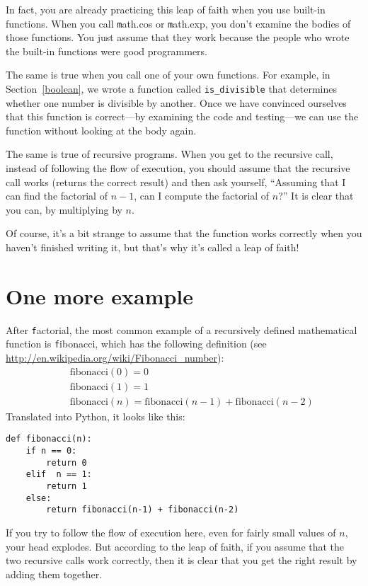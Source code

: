 \documentclass[
DIV=11,
fontsize=12,
twoside,
headinclude=false,
titlepage=firstiscover,
abstract=true,
headsepline=true,
footsepline=true,
chapterprefix=true, %
headings=big,
bibliography=totoc,%
captions=tableheading
]{scrbook}
\theoremstyle{definition}
\begin{document}
In fact, you are already practicing this leap of faith when you use
built-in functions.  When you call {\texttt math.cos} or {\texttt math.exp},
you don't examine the bodies of those functions.  You just
assume that they work because the people who wrote the built-in
functions were good programmers.

The same is true when you call one of your own functions.  For
example, in Section~\ref{boolean}, we wrote a function called 
\verb"is_divisible" that determines whether one number is divisible by
another.  Once we have convinced ourselves that this function is
correct---by examining the code and testing---we can use the function
without looking at the body again.

The same is true of recursive programs.  When you get to the recursive
call, instead of following the flow of execution, you should assume
that the recursive call works (returns the correct result) and then ask
yourself, ``Assuming that I can find the factorial of $n-1$, can I
compute the factorial of $n$?''  It is clear that you
can, by multiplying by $n$.

Of course, it's a bit strange to assume that the function works
correctly when you haven't finished writing it, but that's why
it's called a leap of faith!


\section{One more example}
\label{one.more.example}

After {\texttt factorial}, the most common example of a recursively
defined mathematical function is {\texttt fibonacci}, which has the
following definition (see
  \url{http://en.wikipedia.org/wiki/Fibonacci_number}):
%
\begin{eqnarray*}
&& \mathrm{fibonacci}(0) = 0 \\
&& \mathrm{fibonacci}(1) = 1 \\
&& \mathrm{fibonacci}(n) = \mathrm{fibonacci}(n-1) + \mathrm{fibonacci}(n-2)
\end{eqnarray*}
%
Translated into Python, it looks like this:

\begin{lstlisting}
def fibonacci(n):
    if n == 0:
        return 0
    elif  n == 1:
        return 1
    else:
        return fibonacci(n-1) + fibonacci(n-2)
\end{lstlisting}
%
If you try to follow the flow of execution here, even for fairly
small values of $n$, your head explodes.  But according to the
leap of faith, if you assume that the two recursive calls
work correctly, then it is clear that you get
the right result by adding them together.
\end{document}
